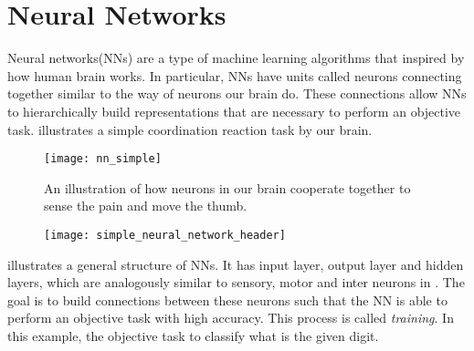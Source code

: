 \section{Neural Networks}
Neural networks(NNs) are a type of machine learning algorithms that inspired by how human brain works.  In particular, NNs have units called neurons connecting together similar to the way of neurons our brain do. These connections allow NNs to hierarchically build representations that are necessary to perform an objective task. \addfigure{\ref{fig:nn_simple}} illustrates a simple coordination reaction task by our brain.

 \begin{figure}[ht!]
    \begin{center}

\texttt{[image: nn\_simple]}
\caption[xxx]{An illustration of how neurons in our brain  cooperate together to sense the pain and move the thumb. \footnotemark}
\label{fig:nn_simple}

\end{center}
\end{figure}


 \begin{figure}[ht!]
    \begin{center}

\texttt{[image: simple\_neural\_network\_header]}
\caption[xxx]{}
\label{fig:nn_typical_structure}

\end{center}
\end{figure}

\addfigure{\ref{fig:nn_typical_structure}} illustrates a general structure of NNs. It has input layer, output layer and hidden layers, which are analogously similar to sensory, motor and inter neurons in \addfigure{\ref{fig:nn_simple}}. The goal is to build connections between these neurons such that the NN is able to perform an objective task with high accuracy. This process is called \textit{training}.  In this example, the objective task to classify what is the given digit.


